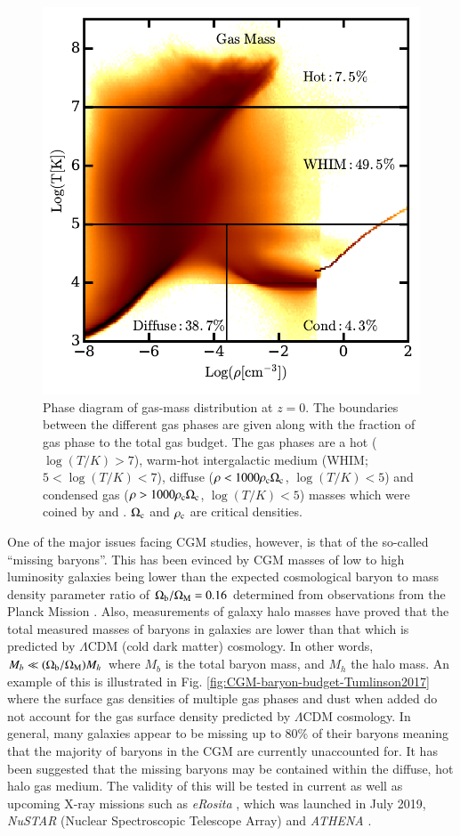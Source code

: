 \begin{figure}
 \centering
 \includegraphics[width=0.7\columnwidth]{plots_chp1/Phase_diag_Torrey2019}
 \caption[Phase diagram of a simulated gas-mass distribution at $z=0$]{Phase diagram of gas-mass distribution at $z=0.$ The boundaries between the different gas phases are given along with the fraction of gas phase to the total gas budget. The gas phases are a hot ($\log{(T/K)} > 7$), warm-hot intergalactic medium (WHIM; $5 < \log{(T/K)} < 7$), diffuse ($\rho < 1000\rho_{\rm c}\Omega_{\rm c}$, $\log{(T/K)} < 5$) and condensed gas ($\rho > 1000\rho_{\rm c}\Omega_{\rm c}$, $\log{(T/K)} < 5$) masses which were coined by \citet{Dave2001} and \citet{Haider2016}. $\Omega_{\rm c}$ and $\rho_{\rm c}$ are critical densities.}
 \label{fig:phase-diagram-gas-Torrey2019}
\end{figure}

One of the major issues facing CGM studies, however, is that of the so-called ``missing baryons''. This has been evinced by CGM masses of low to high luminosity galaxies being lower than the expected cosmological baryon to mass density parameter ratio of $\Omega_{\rm b}/\Omega_{\rm M}=0.16$ determined from observations from the Planck Mission \citep{Planck2016}. Also, measurements of galaxy halo masses have proved that the total measured masses of baryons in galaxies are lower than that which is predicted by  $\Lambda$CDM (cold dark matter) cosmology. In other words, $M_b \ll (\Omega_{\rm b}/\Omega_{\rm M})M_h$ where $M_b$ is the total baryon mass, and $M_h$ the halo mass. An example of this is illustrated in Fig. \ref{fig:CGM-baryon-budget-Tumlinson2017} where the surface gas densities of multiple gas phases and dust when added do not account for the gas surface density predicted by $\Lambda$CDM cosmology. In general, many galaxies appear to be missing up to $80\%$ of their baryons meaning that the majority of baryons in the CGM are currently unaccounted for. It has been suggested that the missing baryons may be contained within the diffuse, hot halo gas medium. The validity of this will be tested in current as well as upcoming X-ray missions such as {\it eRosita} \citep{Merloni2012}, which was launched in July 2019, {\it NuSTAR} (Nuclear Spectroscopic Telescope Array) \citep{Harrison2013} and {\it ATHENA} \citep{Nandra2013}. 


